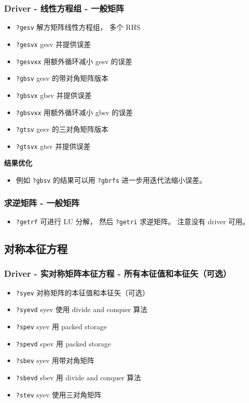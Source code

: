 \subsubsection{Driver - 线性方程组 - 一般矩阵}
\begin{itemize}
\item \verb|?gesv| 解方矩阵线性方程组， 多个 RHS
\item \verb|?gesvx| gesv 并提供误差
\item \verb|?gesvxx| 用额外循环减小 gesv 的误差
\item \verb|?gbsv| gesv 的带对角矩阵版本
\item \verb|?gbsvx| gbsv 并提供误差
\item \verb|?gbsvxx| 用额外循环减小 gbsv 的误差
\item \verb|?gtsv| gesv 的三对角矩阵版本
\item \verb|?gtsvx| gtsv 并提供误差
\end{itemize}

\textbf{结果优化}
\begin{itemize}
\item 例如 \verb|?gbsv| 的结果可以用 \verb|?gbrfs| 进一步用迭代法缩小误差。
\end{itemize}

\subsubsection{求逆矩阵 - 一般矩阵}
\begin{itemize}
\item \verb|?getrf| 可进行 LU 分解， 然后 \verb|?getri| 求逆矩阵。 注意没有 driver 可用。
\end{itemize}


\subsection{对称本征方程}
\subsubsection{Driver - 实对称矩阵本征方程 - 所有本征值和本征矢（可选）}
\begin{itemize}
\item \verb|?syev| 对称矩阵的本征值和本征矢（可选）
\item \verb|?syevd| syev 使用 divide and conquer 算法
\item \verb|?spev| syev 用 packed storage
\item \verb|?spevd| spev 用 packed storage
\item \verb|?sbev| syev 用带对角矩阵
\item \verb|?sbevd| sbev 用 divide and conquer 算法
\item \verb|?stev| syev 使用三对角矩阵
\end{itemize}

